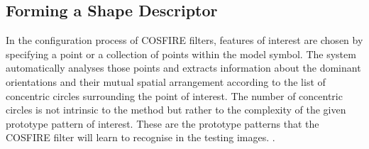 \subsection{Forming a Shape Descriptor}
\label{sec:descriptor}

In the configuration process of COSFIRE filters, features of interest are chosen by specifying a point or a collection of points within the model symbol. The system automatically analyses those points and extracts information about the dominant orientations and their mutual spatial arrangement according to the list of concentric circles surrounding the point of interest. The number of concentric circles is not intrinsic to the method but rather to the complexity of the given prototype pattern of interest. These are the prototype patterns that the COSFIRE filter will learn to recognise in the testing images. \cite{Azzopardi_Petkov_2012}. \\

